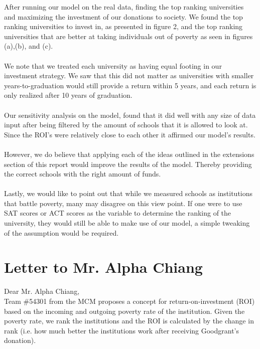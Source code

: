\documentclass[12pt]{scrartcl}
\begin{document}
	After running our model on the real data, finding the top ranking universities and maximizing the investment of our donations to society. We found the top ranking universities to invest in, as presented in figure 2, and the top ranking universities that are better at taking individuals out of poverty as seen in figures (a),(b), and (c).\\
	\\
	We note that we treated each university as having equal footing in our investment strategy. We saw that this did not matter	as universities with smaller years-to-graduation would still provide a return within 5 years, and each return is only realized after 10 years of graduation.\\
	\\	
	Our sensitivity analysis on the model, found that it did well with any size of data input after being filtered by the amount of schools that it is allowed to look at. Since the ROI's were relatively close to each other it affirmed our model's results.\\
	\\
	However, we do believe that applying each of the ideas outlined in the extensions section of this report would improve the results of the model. Thereby providing the correct schools with the right amount of funds.\\
	\\
	Lastly, we would like to point out that while we measured schools as institutions that battle poverty, many may disagree on this view point. If one were to use SAT scores or ACT scores as the variable to determine the ranking of the university, they would still be able to make use of our model, a simple tweaking of the assumption would be required.
\clearpage

\section{Letter to Mr. Alpha Chiang}
Dear Mr. Alpha Chiang, \\

Team \#54301 from the MCM proposes  a concept for return-on-investment (ROI) based on the incoming and outgoing poverty rate of the institution. Given the poverty rate, we rank the institutions and the ROI is calculated by the change in rank (i.e. how much better the institutions work after receiving Goodgrant's donation). 


\newpage
\end{document}
